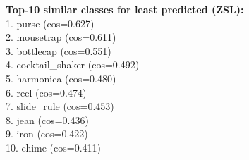 \textbf{Top-10 similar classes for least predicted (ZSL):}\\
1. purse (cos=0.627)\\
2. mousetrap (cos=0.611)\\
3. bottlecap (cos=0.551)\\
4. cocktail_shaker (cos=0.492)\\
5. harmonica (cos=0.480)\\
6. reel (cos=0.474)\\
7. slide_rule (cos=0.453)\\
8. jean (cos=0.436)\\
9. iron (cos=0.422)\\
10. chime (cos=0.411)\\

